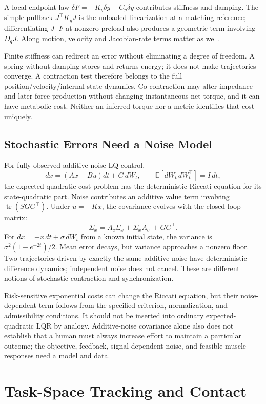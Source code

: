 \documentclass[
  10pt,
  letterpaper,
  DIV=11,
  numbers=noendperiod]{scrartcl}
\begin{document}
A local endpoint law \(\delta F=-K_y\delta y-C_y\delta\dot y\)
contributes stiffness and damping. The simple pullback \(J^\top K_yJ\)
is the unloaded linearization at a matching reference; differentiating
\(J^\top F\) at nonzero preload also produces a geometric term involving
\(D_qJ\). Along motion, velocity and Jacobian-rate terms matter as well.

Finite stiffness can redirect an error without eliminating a degree of
freedom. A spring without damping stores and returns energy; it does not
make trajectories converge. A contraction test therefore belongs to the
full position/velocity/internal-state dynamics. Co-contraction may alter
impedance and later force production without changing instantaneous net
torque, and it can have metabolic cost. Neither an inferred torque nor a
metric identifies that cost uniquely.

\subsection{Stochastic Errors Need a Noise
Model}\label{stochastic-errors-need-a-noise-model}

For fully observed additive-noise LQ control, \[
dx=(Ax+Bu)dt+G\,dW_t,\qquad \mathbb E[dW_t\,dW_t^\top]=I\,dt,
\] the expected quadratic-cost problem has the deterministic Riccati
equation for its state-quadratic part. Noise contributes an additive
value term involving \(\operatorname{tr}(SGG^\top)\). Under \(u=-Kx\),
the covariance evolves with the closed-loop matrix: \[
\dot\Sigma_x=A_c\Sigma_x+\Sigma_xA_c^\top+GG^\top.
\] For \(dx=-x\,dt+\sigma\,dW_t\) from a known initial state, the variance
is \(\sigma^2(1-e^{-2t})/2\). Mean error decays, but variance approaches
a nonzero floor. Two trajectories driven by exactly the same additive
noise have deterministic difference dynamics; independent noise does not
cancel. These are different notions of stochastic contraction and
synchronization.

Risk-sensitive exponential costs can change the Riccati equation, but
their noise-dependent term follows from the specified criterion,
normalization, and admissibility conditions. It should not be inserted
into ordinary expected-quadratic LQR by analogy. Additive-noise
covariance alone also does not establish that a human must always
increase effort to maintain a particular outcome; the objective,
feedback, signal-dependent noise, and feasible muscle responses need a
model and data.

\section{Task-Space Tracking and
Contact}\label{task-space-tracking-and-contact}
\end{document}
